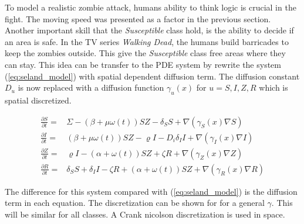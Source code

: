 \documentclass[%
twoside,                 %
final,                   %
10pt]{article}
\begin{document}
To model a realistic zombie attack, humans ability to think logic is crucial in the fight. The moving speed was presented as a factor in the previous section. Another important skill that the \emph{Susceptible} class hold, is the ability to decide if an area is safe. In the TV series \emph{Walking Dead}, the humans build barricades to keep the zombies outside. This give the \emph{Susceptible} class free areas where they can stay. This idea can be transfer to the PDE system by rewrite the system (\ref{eq:seland_model}) with spatial dependent diffusion term. The diffusion constant $D_u$ is now replaced with a diffusion function $\gamma_u(x)$ for $u= S,I,Z,R$ which is spatial discretized.

\begin{equation} \label{eq:seland_model_diff}
    \begin{aligned} 
    \frac{\partial S}{\partial t} =& \Sigma -(\beta+\mu \omega(t))SZ - \delta_SS +\nabla(\gamma_S(x) \nabla S) \\
    \frac{\partial I}{\partial t} =& (\beta+\mu \omega(t))SZ - \varrho I - D_i\delta_II+\nabla(\gamma_I(x) \nabla I)\\
    \frac{\partial Z}{\partial t} =& \varrho I- (\alpha+\omega(t))SZ + \zeta R+\nabla(\gamma_Z(x) \nabla Z)\\
    \frac{\partial R}{\partial t} =& \delta_SS +\delta_II -\zeta R + (\alpha+\omega(t))SZ+\nabla(\gamma_R(x) \nabla R) 
    \end{aligned}
\end{equation}

The difference for this system compared with (\ref{eq:seland_model}) is the diffusion term in each equation. The discretization can be shown for for a general $\gamma$. This will be similar for all classes. A Crank nicolson discretization is used in space.
\end{document}
